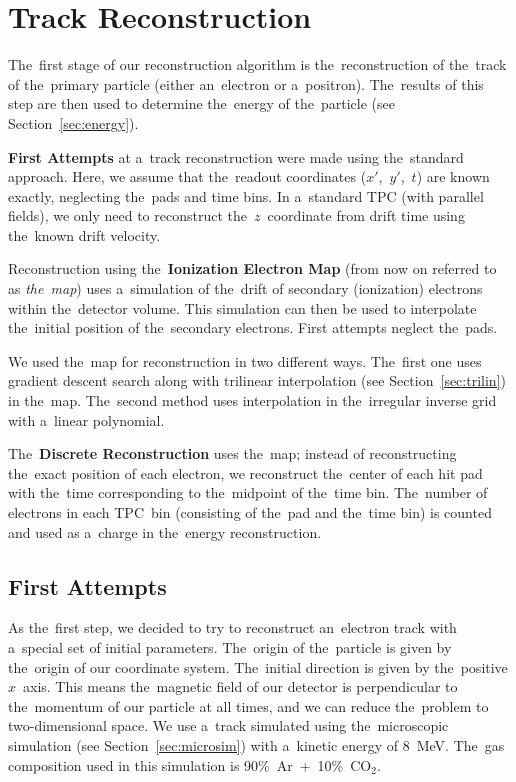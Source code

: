 \chapter{Track Reconstruction}
\label{sec:track}
	The~first stage of our reconstruction algorithm is the~reconstruction of the~track of the~primary particle (either an~electron or a~positron). The~results of this step are then used to determine the~energy of the~particle (see Section~\ref{sec:energy}).
	
	\textbf{First Attempts} at a~track reconstruction were made using the~standard approach. Here, we assume that the~readout coordinates ($x'$,~$y'$,~$t$) are known exactly, neglecting the~pads and time bins. In a~standard \ac{TPC} (with parallel fields), we only need to reconstruct the~$z$~coordinate from drift time using the~known drift velocity.
	
	Reconstruction using the~\textbf{Ionization Electron Map} (from now on referred to as \emph{the~map}) uses a~simulation of the~drift of secondary (ionization) electrons within the~detector volume. This simulation can then be used to interpolate the~initial position of the~secondary electrons. First attempts neglect the~pads.
	
	We used the~map for reconstruction in two different ways. The~first one uses gradient descent search along with trilinear interpolation (see Section~\ref{sec:trilin}) in the~map. The~second method uses interpolation in the~irregular inverse grid with a~linear polynomial.
	
	The~\textbf{Discrete Reconstruction} uses the~map; instead of reconstructing the~exact position of each electron, we reconstruct the~center of each hit pad with the~time corresponding to the~midpoint of the~time bin. The~number of electrons in each \ac{TPC}~bin (consisting of the~pad and the~time bin) is counted and used as a~charge in the~energy reconstruction.
	
	\section{First Attempts}
	\label{sec:trackfirst}
		As the~first step, we decided to try to reconstruct an~electron track with a~special set of initial parameters. The~origin of the~particle is given by the~origin of our coordinate system. The~initial direction is given by the~positive $x$~axis. This means the~magnetic field of our detector is perpendicular to the~momentum of our particle at all times, and we can reduce the~problem to two-dimensional space. We use a~track simulated using the~microscopic simulation (see Section~\ref{sec:microsim}) with a~kinetic energy of 8~MeV. The~gas composition used in this simulation is 90\%~Ar~+~10\%~CO$_2$.
		
